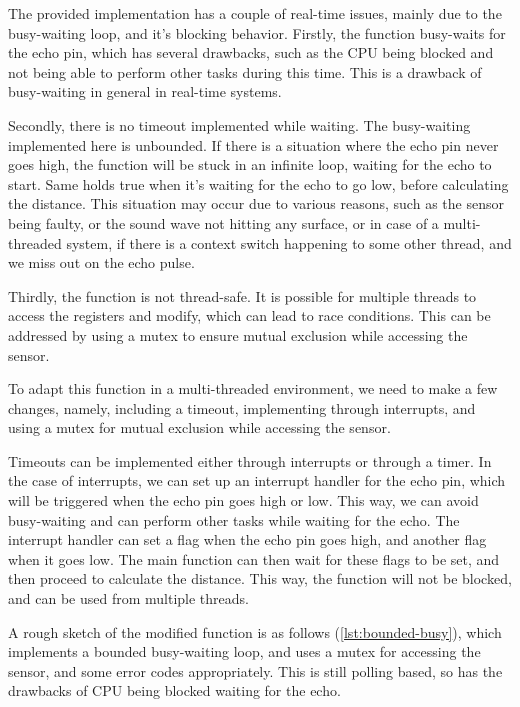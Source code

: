 The provided implementation has a couple of real-time issues, mainly due to the busy-waiting loop, and it's blocking behavior.
Firstly, the function busy-waits for the echo pin, which has several drawbacks, such as the CPU being blocked and not being able to perform other tasks during this time.
This is a drawback of busy-waiting in general in real-time systems.

Secondly, there is no timeout implemented while waiting.
The busy-waiting implemented here is unbounded.
If there is a situation where the echo pin never goes high, the function will be stuck in an infinite loop, waiting for the echo to start.
Same holds true when it's waiting for the echo to go low, before calculating the distance.
This situation may occur due to various reasons, such as the sensor being faulty, or the sound wave not hitting any surface, or in case of a multi-threaded system, if there is a context switch happening to some other thread, and we miss out on the echo pulse.

Thirdly, the function is not thread-safe.
It is possible for multiple threads to access the registers and modify, which can lead to race conditions.
This can be addressed by using a mutex to ensure mutual exclusion while accessing the sensor.

\vspace*{1em}
To adapt this function in a multi-threaded environment, we need to make a few changes, namely, including a timeout, implementing through interrupts, and using a mutex for mutual exclusion while accessing the sensor.

Timeouts can be implemented either through interrupts or through a timer.
In the case of interrupts, we can set up an interrupt handler for the echo pin, which will be triggered when the echo pin goes high or low.
This way, we can avoid busy-waiting and can perform other tasks while waiting for the echo.
The interrupt handler can set a flag when the echo pin goes high, and another flag when it goes low.
The main function can then wait for these flags to be set, and then proceed to calculate the distance.
This way, the function will not be blocked, and can be used from multiple threads.

\vspace*{1em}
A rough sketch of the modified function is as follows (\autoref{lst:bounded-busy}), which implements a bounded busy-waiting loop, and uses a mutex for accessing the sensor, and some error codes appropriately.
This is still polling based, so has the drawbacks of CPU being blocked waiting for the echo.

